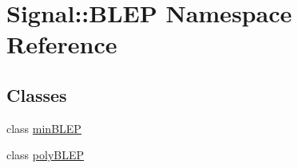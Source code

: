 \hypertarget{namespaceSignal_1_1BLEP}{\section{Signal\+:\+:B\+L\+E\+P Namespace Reference}
\label{namespaceSignal_1_1BLEP}
}
\subsection*{Classes}
\begin{DoxyCompactItemize}
\item 
class \hyperlink{classSignal_1_1BLEP_1_1minBLEP}{min\+B\+L\+E\+P}
\item 
class \hyperlink{classSignal_1_1BLEP_1_1polyBLEP}{poly\+B\+L\+E\+P}
\end{DoxyCompactItemize}
